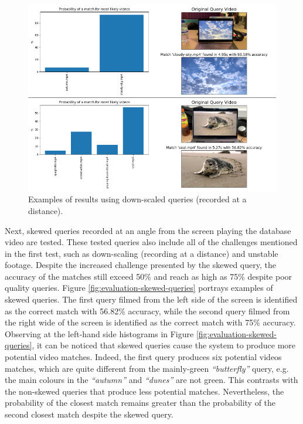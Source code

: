 \begin{figure}[h] 
\centerline{\includegraphics[width=\textwidth]{figures/evaluation/downscaled-queries.png}}
\caption{\label{fig:evaluation-downscaled-queries}Examples of results using down-scaled queries (recorded at a distance).}
\end{figure}

Next, skewed queries recorded at an angle from the screen playing the database video are tested. These tested queries also include all of the challenges mentioned in the first test, such as down-scaling (recording at a distance) and unstable footage. Despite the increased challenge presented by the skewed query, the accuracy of the matches still exceed 50\% and reach as high as 75\% despite poor quality queries. Figure \ref{fig:evaluation-skewed-queries} portrays examples of skewed queries. The first query filmed from the left side of the screen is identified as the correct match with 56.82\% accuracy, while the second query filmed from the right wide of the screen is identified as the correct match with 75\% accuracy. Observing at the left-hand side histograms in Figure \ref{fig:evaluation-skewed-queries}, it can be noticed that skewed queries cause the system to produce more potential video matches. Indeed, the first query produces six potential videos matches, which are quite different from the mainly-green \textit{``butterfly''} query, e.g. the main colours in the \textit{``autumn''} and \textit{``dunes''} are not green. This contrasts with the non-skewed queries that produce less potential matches. Nevertheless, the probability of the closest match remains greater than the probability of the second closest match despite the skewed query. %

